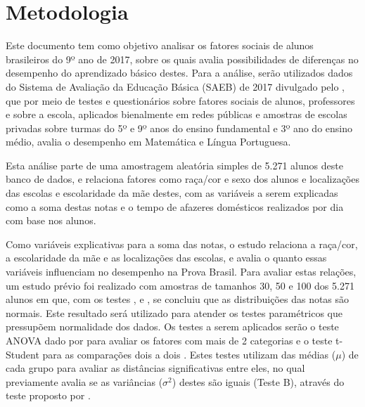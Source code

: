 

\chapter{Metodologia}
Este documento tem como objetivo analisar os fatores sociais de alunos brasileiros do 9º ano de 2017,
sobre os quais avalia possibilidades de diferenças no desempenho do aprendizado básico destes.
Para a análise, serão utilizados dados do Sistema de Avaliação da Educação Básica (SAEB) de 2017 
divulgado pelo , que por meio de testes e questionários sobre fatores sociais de
alunos, professores e sobre a escola, aplicados bienalmente em redes públicas
e amostras de escolas privadas sobre turmas do 5º e 9º anos do ensino fundamental e 
3º ano do ensino médio, avalia o desempenho em Matemática e Língua Portuguesa.

Esta análise parte de uma amostragem aleatória simples de 5.271 alunos deste banco de dados, e relaciona 
fatores como raça/cor e sexo dos alunos e localizações das escolas e escolaridade da mãe destes, com as variáveis
a serem explicadas como a soma destas notas e o tempo de afazeres domésticos realizados por dia com base nos alunos.

Como variáveis explicativas para a soma das notas, o estudo relaciona a raça/cor, a escolaridade da mãe e as localizações das escolas,
e avalia o quanto essas variáveis influenciam no desempenho na Prova Brasil. Para avaliar estas relações, um estudo prévio foi realizado
com amostras de tamanhos 30, 50 e 100 dos 5.271 alunos em que, com os testes , 
e , se concluiu que as distribuições das notas são normais. Este resultado será utilizado para atender
os testes paramétricos que pressupõem normalidade dos dados. Os testes a serem aplicados serão o teste ANOVA dado por  para 
avaliar os fatores com mais de 2 categorias e o teste t-Student para as comparações dois a dois \cite{o1908student}.
Estes testes utilizam das médias ($\mu$) de cada grupo para avaliar as distâncias significativas entre eles, no qual previamente avalia se as
variâncias ($\sigma^2$) destes são iguais (Teste B), através do teste proposto por .

